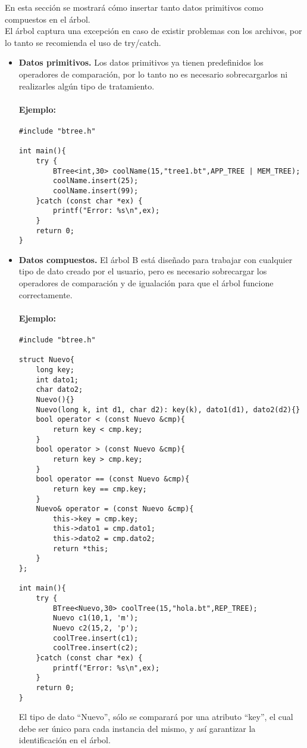 \documentclass{book}
\begin{document}
En esta sección se mostrará cómo insertar tanto datos primitivos como compuestos en el árbol.\\
El árbol captura una excepción en caso de existir problemas con los archivos, por lo tanto se recomienda el uso de try/catch.
\begin{itemize}
\item {\bf Datos primitivos.}
Los datos primitivos ya tienen predefinidos los operadores de comparación, por lo tanto no es necesario sobrecargarlos ni realizarles algún tipo de tratamiento.\\

\paragraph{Ejemplo:} 
\begin{verbatim}
#include "btree.h"

int main(){
    try {
        BTree<int,30> coolName(15,"tree1.bt",APP_TREE | MEM_TREE);
        coolName.insert(25);
        coolName.insert(99);
    }catch (const char *ex) {
        printf("Error: %s\n",ex);
    }
    return 0;
}
\end{verbatim}

\item {\bf Datos compuestos.}
El árbol B está diseñado para trabajar con cualquier tipo de dato creado por el usuario, pero es necesario sobrecargar los operadores de comparación y de igualación para que el árbol funcione correctamente.
\paragraph{Ejemplo:} 

\begin{verbatim}
#include "btree.h"

struct Nuevo{
    long key;
    int dato1;
    char dato2;
    Nuevo(){}
    Nuevo(long k, int d1, char d2): key(k), dato1(d1), dato2(d2){}
    bool operator < (const Nuevo &cmp){
        return key < cmp.key;
    }
    bool operator > (const Nuevo &cmp){
        return key > cmp.key;
    }
    bool operator == (const Nuevo &cmp){
        return key == cmp.key;
    }
    Nuevo& operator = (const Nuevo &cmp){
        this->key = cmp.key;
        this->dato1 = cmp.dato1;
        this->dato2 = cmp.dato2;
        return *this;
    }
};

int main(){
    try {
        BTree<Nuevo,30> coolTree(15,"hola.bt",REP_TREE);
        Nuevo c1(10,1, 'm');
        Nuevo c2(15,2, 'p');
        coolTree.insert(c1);
        coolTree.insert(c2);
    }catch (const char *ex) {
        printf("Error: %s\n",ex);
    }
    return 0;
}
\end{verbatim}

El tipo de dato ``Nuevo'', sólo se comparará por una atributo ``key'', el cual debe ser único para cada instancia del mismo, y así garantizar la identificación en el árbol.

\end{itemize}
\end{document}
